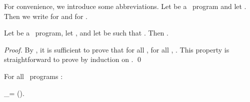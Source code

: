 \documentclass[fleqn]{llncs}
\begin{document}
For convenience, we introduce some abbreviations.
Let  be a \PGLD\ program and let
.
Then we write  for
 and  for
.

\begin{proposition}
\label{prop-interpretation}
Let  be a \PGLD\ program,
let , and
let  be such that
.
Then
.
\end{proposition}
\begin{proof}
By \AIP, it is sufficient to prove that for all , for all
,
.
This property is straightforward to prove by induction on .
\qed
\end{proof}

\begin{theorem}
\label{theorem-correctness}
For all \PGLD\ programs :
\begin{ldispl}
_\sPGLD =
\abstr()\;.
\end{ldispl}
\end{theorem}
\end{document}
